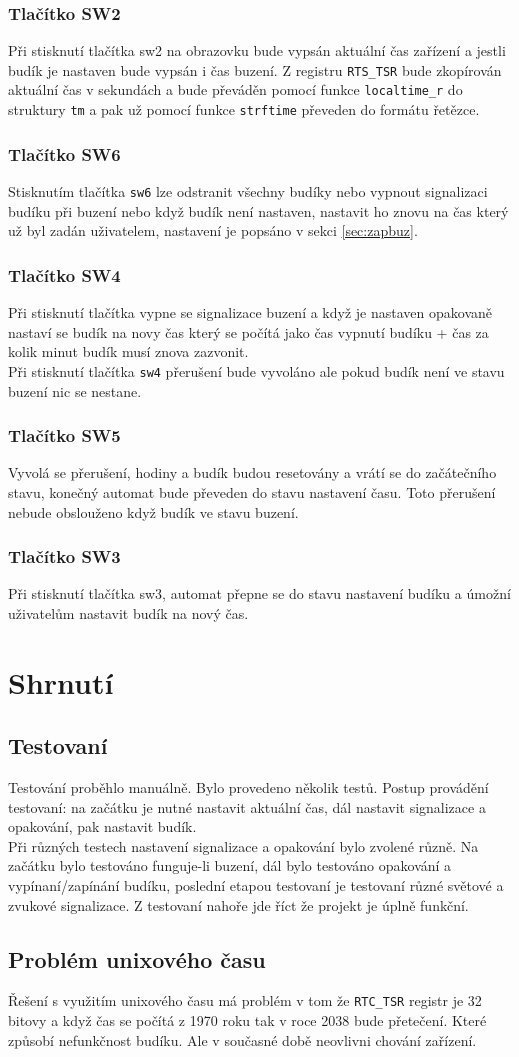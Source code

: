 \documentclass[a4paper,11pt]{article}
\begin{document}
\subsubsection{Tlačítko SW2}
Při stisknutí tlačítka sw2 na obrazovku bude vypsán aktuální čas zařízení a jestli budík je nastaven bude vypsán i čas buzení. Z registru \texttt{RTS\_TSR} bude zkopírován aktuální čas v sekundách a bude  převáděn pomocí funkce \texttt{localtime\_r} do struktury \texttt{tm} a pak už pomocí funkce \texttt{strftime} převeden do formátu řetězce.
\subsubsection{Tlačítko SW6}
Stisknutím tlačítka \texttt{sw6} lze odstranit všechny budíky nebo vypnout signalizaci budíku při buzení nebo když budík není nastaven, nastavit ho znovu na čas který už byl zadán uživatelem, nastavení je popsáno v sekci \ref{sec:zapbuz}.
\subsubsection{Tlačítko SW4}
 Při stisknutí tlačítka vypne se signalizace buzení a když je nastaven opakovaně nastaví se budík na novy čas který se počítá jako čas vypnutí budíku + čas za kolik minut budík musí znova zazvonit.\\
Při stisknutí tlačítka \texttt{sw4} přerušení bude vyvoláno ale pokud budík není ve stavu buzení nic se nestane.
\subsubsection{Tlačítko SW5}
Vyvolá se přerušení, hodiny a budík budou resetovány a vrátí se do začátečního stavu, konečný automat bude převeden do stavu nastavení času. Toto přerušení nebude obslouženo když budík ve stavu buzení.
\subsubsection{Tlačítko SW3}
Při stisknutí tlačítka sw3, automat přepne se do stavu nastavení budíku a úmožní uživatelům nastavit budík na nový čas.

\section{Shrnutí}
\subsection{Testovaní}
Testování proběhlo manuálně. Bylo provedeno několik testů. Postup provádění testovaní: na začátku je nutné nastavit aktuální čas, dál nastavit signalizace a opakování, pak nastavit budík.\\
Při různých testech nastavení signalizace a opakování bylo zvolené různě. Na začátku bylo testováno funguje-li buzení, dál bylo testováno opakování a vypínaní/zapínání budíku, poslední etapou testovaní je testovaní různé světové a zvukové signalizace. Z testovaní nahoře jde říct že projekt je úplně funkční.

\subsection{Problém unixového času}
\label{sec:prob}
Řešení s využitím unixového času má problém v tom že \texttt{RTC\_TSR} registr je 32 bitovy a když čas se počítá z 1970 roku tak v roce 2038 bude přetečení. Které způsobí nefunkčnost budíku. Ale v současné době neovlivni chování zařízení.
\end{document}
